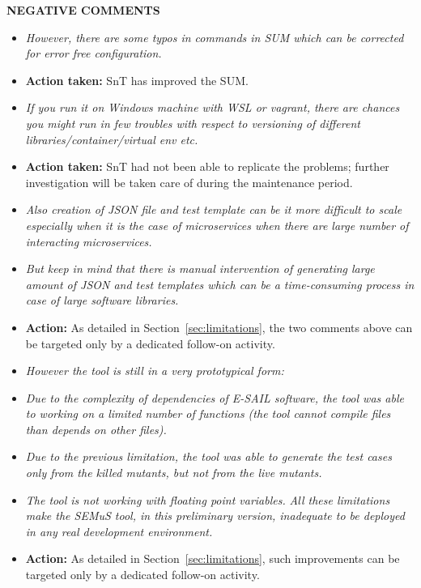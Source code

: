 \textbf{NEGATIVE  COMMENTS}
\begin{itemize}
  \item \emph{However, there are some typos in commands in SUM which can be corrected for error free configuration.}

  \item \textbf{Action taken:} SnT has improved the SUM.

  \item \emph{If you run it on Windows machine with WSL or vagrant, there are chances you might run in few troubles with respect to versioning of different libraries/container/virtual env etc.}

  \item \textbf{Action taken:} SnT had not been able to replicate the problems; further investigation will be taken care of during the maintenance period.

  \item \emph{Also creation of JSON file and test template can be it more difficult to scale especially when it is the case of microservices when there are large number of interacting microservices.}

  \item \emph{But keep in mind that there is manual intervention of generating large amount of JSON and test templates which can be a time-consuming process in case of large software libraries.}

  \item \textbf{Action:} As detailed in Section~\ref{sec:limitations}, the two comments above can be targeted only by a dedicated follow-on activity.

  \item \emph{However the tool is still in a very prototypical form:}

  \item \emph{Due to the complexity of dependencies of E-SAIL software, the tool was able to working on a limited number of functions (the tool cannot compile files than depends on other files).}

  \item \emph{Due to the previous limitation, the tool was able to generate the test cases only from the killed mutants, but not from the live mutants.}

  \item \emph{The tool is not working with floating point variables.}
  \emph{All these limitations make the SEMuS tool, in this preliminary version, inadequate to be deployed in any real development environment. }

  \item \textbf{Action:} As detailed in Section~\ref{sec:limitations}, such improvements can be targeted only by a dedicated follow-on activity.

\end{itemize}

\ENDCHANGEDWPT
